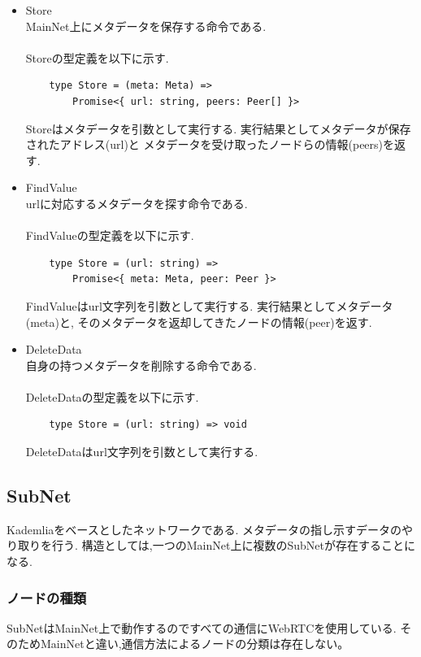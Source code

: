 \documentclass[sotsuron]{jcsie}
\begin{document}
\begin{itemize}
	\item {Store}\\
	MainNet上にメタデータを保存する命令である.
	\\\\
	Storeの型定義を以下に示す.
	\begin{lstlisting}
	type Store = (meta: Meta) => 
		Promise<{ url: string, peers: Peer[] }>
	\end{lstlisting}

	Storeはメタデータを引数として実行する.
	実行結果としてメタデータが保存されたアドレス(url)と
	メタデータを受け取ったノードらの情報(peers)を返す.
	\\
	\item {FindValue}\\
	urlに対応するメタデータを探す命令である.
	\\\\
	FindValueの型定義を以下に示す.
	\begin{lstlisting}
	type Store = (url: string) => 
		Promise<{ meta: Meta, peer: Peer }>
	\end{lstlisting}

	FindValueはurl文字列を引数として実行する.
	実行結果としてメタデータ(meta)と,
	そのメタデータを返却してきたノードの情報(peer)を返す.
	\\
	\item {DeleteData}\\
	自身の持つメタデータを削除する命令である.
	\\\\
	DeleteDataの型定義を以下に示す.
	\begin{lstlisting}
	type Store = (url: string) => void
	\end{lstlisting}

	DeleteDataはurl文字列を引数として実行する.
\end{itemize}

\subsection{SubNet}
Kademliaをベースとしたネットワークである.
メタデータの指し示すデータのやり取りを行う.
構造としては,一つのMainNet上に複数のSubNetが存在することになる.

\subsubsection{ノードの種類}
SubNetはMainNet上で動作するのですべての通信にWebRTCを使用している.
そのためMainNetと違い,通信方法によるノードの分類は存在しない。
\end{document}
